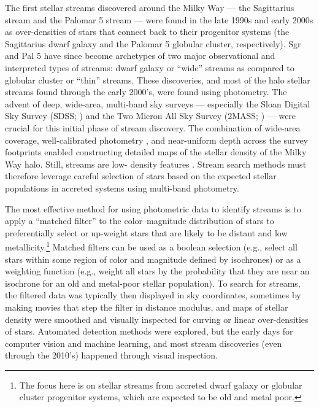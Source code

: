 \documentclass[final,5p,times,twocolumn,authoryear]{elsarticle}
\begin{document}
The first stellar streams discovered around the Milky Way --- the Sagittarius stream
\citep[Sgr,][]{ibata:1994,ibata:1995} and the Palomar 5 stream \citep[Pal~5,][]{odenkirchen:2001,rockosi:2002} --- were found in the late 1990s and early 2000s
as over-densities of stars that connect back to their progenitor systems (the
Sagittarius dwarf galaxy and the Palomar 5 globular cluster, respectively).
Sgr and Pal 5 have since become archetypes of two major observational and interpreted
types of streams: dwarf galaxy or ``wide'' streams as compared to globular cluster or
``thin'' streams.
These discoveries, and most of the halo stellar streams found through the early 2000's,
were found using photometry.
The advent of deep, wide-area, multi-band sky surveys --- especially the Sloan Digital
Sky Survey (SDSS; \citealt{york:2000, gunn:1998, fukugita:1996}) and the Two Micron All
Sky Survey (2MASS; \citealt{skrutskie:2006}) --- were crucial for this initial phase of
stream discovery.
The combination of wide-area coverage, well-calibrated photometry
\citep{padmanabhan:2008}, and near-uniform depth across the survey footprints enabled
constructing detailed maps of the stellar density of the Milky Way halo.
Still, streams are  low- density features .
Stream search methods must therefore leverage careful selection of stars based on the
expected stellar populations in accreted systems using multi-band photometry.

The most effective method for using photometric data to identify streams is to apply a
``matched filter'' \citep{rockosi:2002} to the color--magnitude distribution of stars
to preferentially select or up-weight stars that are likely to be distant and low
metallicity.\footnote{The focus here is on stellar streams from accreted dwarf galaxy or
globular cluster progenitor systems, which are expected to be old and metal poor.}
Matched filters can be used as a boolean selection (e.g., select all stars within some
region of color and magnitude defined by isochrones) or as a weighting function (e.g.,
weight all stars by the probability that they are near an isochrone for an old and
metal-poor stellar population).
To search for streams, the filtered data was typically then displayed in sky
coordinates, sometimes by making movies that step the filter in distance modulus, and
maps of stellar density were smoothed and visually inspected for curving or linear
over-densities of stars.
Automated detection methods were explored, but  the early days for computer
vision and machine learning, and most stream discoveries (even through the 2010's)
happened through visual inspection.
\end{document}
